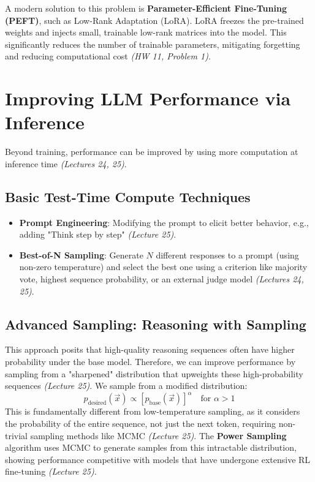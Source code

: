 \documentclass[11pt]{article}
\begin{document}
A modern solution to this problem is \textbf{Parameter-Efficient Fine-Tuning (PEFT)}, such as Low-Rank Adaptation (LoRA). LoRA freezes the pre-trained weights and injects small, trainable low-rank matrices into the model. This significantly reduces the number of trainable parameters, mitigating forgetting and reducing computational cost \textit{(HW 11, Problem 1)}.

\section{Improving LLM Performance via Inference}
Beyond training, performance can be improved by using more computation at inference time \textit{(Lectures 24, 25)}.

\subsection{Basic Test-Time Compute Techniques}
\begin{itemize}
    \item \textbf{Prompt Engineering}: Modifying the prompt to elicit better behavior, e.g., adding "Think step by step" \textit{(Lecture 25)}.
    \item \textbf{Best-of-N Sampling}: Generate $N$ different responses to a prompt (using non-zero temperature) and select the best one using a criterion like majority vote, highest sequence probability, or an external judge model \textit{(Lectures 24, 25)}.
\end{itemize}

\subsection{Advanced Sampling: Reasoning with Sampling}
This approach posits that high-quality reasoning sequences often have higher probability under the base model. Therefore, we can improve performance by sampling from a "sharpened" distribution that upweights these high-probability sequences \textit{(Lecture 25)}. We sample from a modified distribution:
\[ p_{\text{desired}}(\vec{x}) \propto [p_{\text{base}}(\vec{x})]^\alpha \quad \text{for } \alpha > 1 \]
This is fundamentally different from low-temperature sampling, as it considers the probability of the entire sequence, not just the next token, requiring non-trivial sampling methods like MCMC \textit{(Lecture 25)}. The \textbf{Power Sampling} algorithm uses MCMC to generate samples from this intractable distribution, showing performance competitive with models that have undergone extensive RL fine-tuning \textit{(Lecture 25)}.
\end{document}
